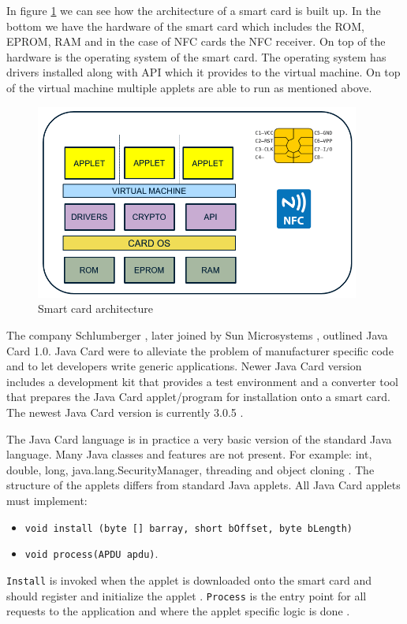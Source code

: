 In figure \ref{fig:smartcardArchitecture} we can see how the architecture of a smart card is built up. In the bottom we have the hardware of the smart card which includes the ROM, EPROM, RAM and in the case of NFC cards the NFC receiver. On top of the hardware is the operating system of the smart card. The operating system has drivers installed along with API which it provides to the virtual machine. On top of the virtual machine multiple applets are able to run as mentioned above.
\begin{figure}[h!]
  \caption{Smart card architecture}
  \label{fig:smartcardArchitecture}
  \centering
    \includegraphics[width=0.95\textwidth]{images/javacardArchitecture.png}
\end{figure}

The company Schlumberger \cite{schlumberger}, later joined by Sun Microsystems \cite{sunMicroSystems}, outlined Java Card 1.0. Java Card were to alleviate the problem of manufacturer specific code and to let developers write generic applications. Newer Java Card version includes a development kit that provides a test environment and a converter tool that prepares the Java Card applet/program for installation onto a smart card. The newest Java Card version is currently 3.0.5 \cite{javacard305}.

The Java Card language is in practice a very basic version of the standard Java language. Many Java classes and features are not present. For example: int, double, long, java.lang.SecurityManager, threading and object cloning \cite{javacardlimits}. The structure of the applets differs from standard Java applets. All Java Card applets must implement:
\begin{itemize}
    \item \texttt{void install (byte [] barray, short bOffset, byte bLength)}
    \item \texttt{void process(APDU apdu)}.
\end{itemize}
\texttt{Install} is invoked when the applet is downloaded onto the smart card and should register and initialize the applet \cite{javacardinstall}. \texttt{Process} is the entry point for all requests to the application and where the applet specific logic is done \cite{javacardprocess}.

